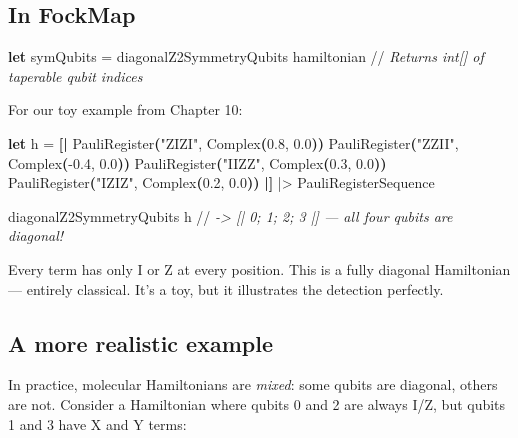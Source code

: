 \documentclass[
  11pt,
  oneside]{book}
\newenvironment{Shaded}{\begin{snugshade}}{\end{snugshade}}
\newcommand{\CommentTok}[1]{\textcolor[rgb]{0.56,0.35,0.01}{\textit{#1}}}
\newcommand{\FloatTok}[1]{\textcolor[rgb]{0.00,0.00,0.81}{#1}}
\newcommand{\KeywordTok}[1]{\textcolor[rgb]{0.13,0.29,0.53}{\textbf{#1}}}
\newcommand{\NormalTok}[1]{#1}
\newcommand{\OperatorTok}[1]{\textcolor[rgb]{0.81,0.36,0.00}{\textbf{#1}}}
\newcommand{\StringTok}[1]{\textcolor[rgb]{0.31,0.60,0.02}{#1}}
\begin{document}
\subsection{In FockMap}\label{in-fockmap}

\begin{Shaded}
\begin{Highlighting}[]
\KeywordTok{let}\NormalTok{ symQubits = diagonalZ2SymmetryQubits hamiltonian}
\NormalTok{//}\CommentTok{ Returns int[] of taperable qubit indices}
\end{Highlighting}
\end{Shaded}

For our toy example from Chapter 10:

\begin{Shaded}
\begin{Highlighting}[]
\KeywordTok{let}\NormalTok{ h =}
    \OperatorTok{[|}\NormalTok{ PauliRegister}\OperatorTok{(}\StringTok{"ZIZI"}\NormalTok{, Complex}\OperatorTok{(}\FloatTok{0.8}\NormalTok{, }\FloatTok{0.0}\OperatorTok{))}
\NormalTok{       PauliRegister}\OperatorTok{(}\StringTok{"ZZII"}\NormalTok{, Complex}\OperatorTok{(}\FloatTok{{-}0.4}\NormalTok{, }\FloatTok{0.0}\OperatorTok{))}
\NormalTok{       PauliRegister}\OperatorTok{(}\StringTok{"IIZZ"}\NormalTok{, Complex}\OperatorTok{(}\FloatTok{0.3}\NormalTok{, }\FloatTok{0.0}\OperatorTok{))}
\NormalTok{       PauliRegister}\OperatorTok{(}\StringTok{"IZIZ"}\NormalTok{, Complex}\OperatorTok{(}\FloatTok{0.2}\NormalTok{, }\FloatTok{0.0}\OperatorTok{))} \OperatorTok{|]}
\NormalTok{    |\textgreater{} PauliRegisterSequence}

\NormalTok{diagonalZ2SymmetryQubits h}
\NormalTok{//}\CommentTok{ -> [| 0; 1; 2; 3 |]  --- all four qubits are diagonal!}
\end{Highlighting}
\end{Shaded}

Every term has only I or Z at every position. This is a fully diagonal
Hamiltonian --- entirely classical. It's a toy, but it illustrates the
detection perfectly.

\subsection{A more realistic example}\label{a-more-realistic-example}

In practice, molecular Hamiltonians are \emph{mixed}: some qubits are
diagonal, others are not. Consider a Hamiltonian where qubits 0 and 2
are always I/Z, but qubits 1 and 3 have X and Y terms:
\end{document}
